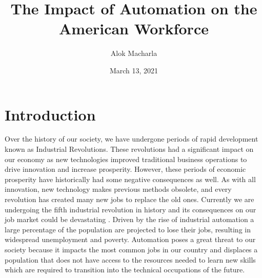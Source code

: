 \documentclass{article}
\title{The Impact of Automation on the American Workforce}
\author{Alok Macharla }
\date{March 13, 2021}
\begin{document}
\maketitle

\section{Introduction}
Over the history of our society, we have undergone periods of rapid development known as Industrial Revolutions. These revolutions had a significant impact on our economy as new technologies improved traditional business operations to drive innovation and increase prosperity. However, these periods of economic prosperity have historically had some negative consequences as well. As with all innovation, new technology makes previous methods obsolete, and every revolution has created many new jobs to replace the old ones. Currently we are undergoing the fifth industrial revolution in history and its consequences on our job market could be devastating \cite{Popkova2019}. Driven by the rise of industrial automation a large percentage of the population are projected to lose their jobs, resulting in widespread unemployment and poverty. Automation poses a great threat to our society because it impacts the most common jobs in our country and displaces a population that does not have access to the resources needed to learn new skills which are required to transition into the technical occupations of the future.
\end{document}
